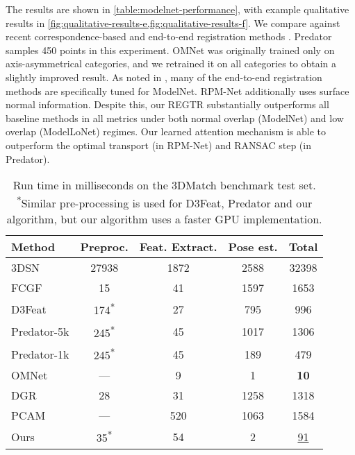\documentclass[10pt,twocolumn,letterpaper]{article}
\begin{document}
The results are shown in \cref{table:modelnet-performance}, with example qualitative results in \cref{fig:qualitative-results-e,fig:qualitative-results-f}.
We compare against recent correspondence-based \cite{huang2021predator} and end-to-end registration methods \cite{wang2019dcp,yew2020rpmnet,aoki2019pointnetlk,xu2021omnet}. Predator \cite{huang2021predator} samples 450 points in this experiment. 
OMNet \cite{xu2021omnet} was originally trained only on axis-asymmetrical categories, and we retrained it on all categories to obtain a slightly improved result.
As noted in \cite{huang2021predator}, many of the end-to-end registration methods are specifically tuned for ModelNet. RPM-Net \cite{yew2020rpmnet} additionally uses surface normal information. Despite this, our REGTR substantially outperforms all baseline methods in all metrics under both normal overlap (ModelNet) and low overlap (ModelLoNet) regimes. Our learned attention mechanism is able to outperform the optimal transport (in RPM-Net) and RANSAC step (in Predator).

\begin{table}[t]
    \footnotesize
    \centering
    \begin{tabularx}{\linewidth}{X | c c c | c}
    \hline
    Method & Preproc. & Feat. Extract. & Pose est. & Total \\
    \hline
    3DSN \cite{gojcic2019perfect} & 27938 & 1872 & 2588 & 32398
    \\
    FCGF \cite{choy2019fcgf} & 15 & 41 & 1597 & 1653
    \\
    D3Feat \cite{bai2020d3feat} & 174\textsuperscript{*} & 27 & 795 & 996 \\
    Predator-5k \cite{huang2021predator} & 245\textsuperscript{*} & 45 & 1017 & 1306
    \\
    Predator-1k \cite{huang2021predator} & 245\textsuperscript{*} & 45 & 189 & 479
    \\
    \hline
    OMNet \cite{xu2021omnet} & --- & 9 & 1 & \textbf{10}
    \\
    DGR \cite{choy2020dgr} & 28 & 31 & 1258 & 1318
    \\
    PCAM \cite{cao2021pcam} & --- & 520 & 1063 & 1584
    \\
    \hline
    Ours & 35\textsuperscript{*} & 54 & 2 & \underline{91} \\
    \hline
    \end{tabularx}
    \caption{Run time in milliseconds on the 3DMatch benchmark test set. \textsuperscript{*}Similar pre-processing is used for D3Feat, Predator and our algorithm, but our algorithm uses a faster GPU implementation.}
    \label{table:timings}
\end{table}
\end{document}
